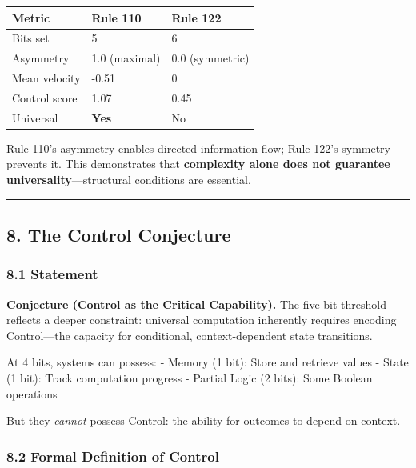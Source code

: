 \documentclass[
  11pt,
]{article}
\begin{document}
\begin{longtable}[]{@{}lll@{}}
\toprule\noalign{}
Metric & Rule 110 & Rule 122 \\
\midrule\noalign{}
\endhead
\bottomrule\noalign{}
\endlastfoot
Bits set & 5 & 6 \\
Asymmetry & 1.0 (maximal) & 0.0 (symmetric) \\
Mean velocity & -0.51 & 0 \\
Control score & 1.07 & 0.45 \\
Universal & \textbf{Yes} & No \\
\end{longtable}

Rule 110's asymmetry enables directed information flow; Rule 122's
symmetry prevents it. This demonstrates that \textbf{complexity alone
does not guarantee universality}---structural conditions are essential.

\begin{center}\rule{0.5\linewidth}{0.5pt}\end{center}

\hypertarget{the-control-conjecture}{%
\subsection{8. The Control Conjecture}\label{the-control-conjecture}}

\hypertarget{statement}{%
\subsubsection{8.1 Statement}\label{statement}}

\textbf{Conjecture (Control as the Critical Capability).} The five-bit
threshold reflects a deeper constraint: universal computation inherently
requires encoding Control---the capacity for conditional,
context-dependent state transitions.

At 4 bits, systems can possess: - Memory (1 bit): Store and retrieve
values - State (1 bit): Track computation progress - Partial Logic (2
bits): Some Boolean operations

But they \emph{cannot} possess Control: the ability for outcomes to
depend on context.

\hypertarget{formal-definition-of-control}{%
\subsubsection{8.2 Formal Definition of
Control}\label{formal-definition-of-control}}
\end{document}
